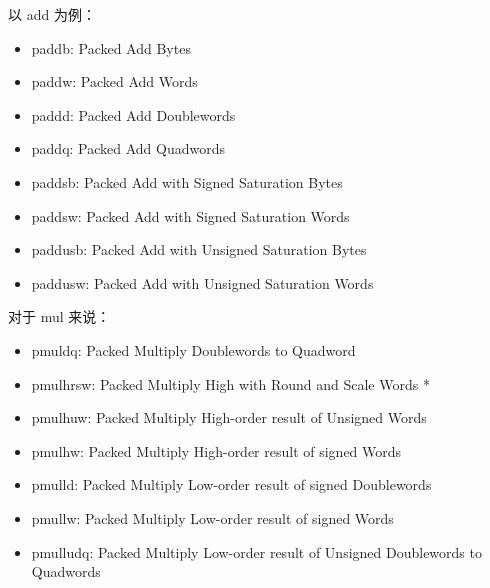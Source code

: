 以 add 为例：

\begin{itemize}
    \item paddb: Packed Add Bytes
    \item paddw: Packed Add Words
    \item paddd: Packed Add Doublewords
    \item paddq: Packed Add Quadwords
    \item paddsb: Packed Add with Signed Saturation Bytes
    \item paddsw: Packed Add with Signed Saturation Words
    \item paddusb: Packed Add with Unsigned Saturation Bytes
    \item paddusw: Packed Add with Unsigned Saturation Words
\end{itemize}

对于 mul 来说：

\begin{itemize}
    \item pmuldq: Packed Multiply Doublewords to Quadword
    \item pmulhrsw: Packed Multiply High with Round and Scale Words *
    \item pmulhuw: Packed Multiply High-order result of Unsigned Words
    \item pmulhw: Packed Multiply High-order result of signed Words
    \item pmulld: Packed Multiply Low-order result of signed Doublewords
    \item pmullw: Packed Multiply Low-order result of signed Words
    \item pmulludq: Packed Multiply Low-order result of Unsigned Doublewords to Quadwords
\end{itemize}